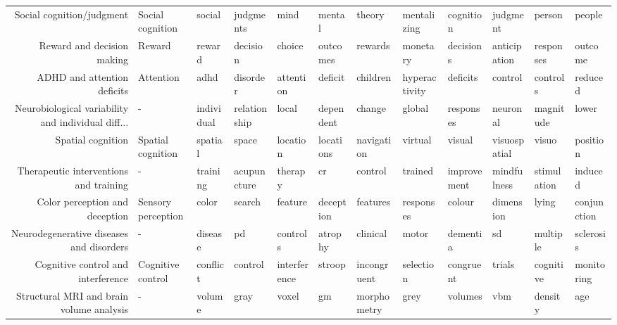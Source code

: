 \documentclass[english]{article}
\begin{document}
\begin{landscape}
\begin{center}
\begin{supertabular}{rlllllllllll}
           Social cognition/judgment &    Social cognition &           social &     judgments &            mind &         mental &      theory &    mentalizing &     cognition &       judgment &        person &         people \\
          Reward and decision making &              Reward &           reward &      decision &          choice &       outcomes &     rewards &       monetary &     decisions &   anticipation &     responses &        outcome \\
         ADHD and attention deficits &           Attention &             adhd &      disorder &       attention &        deficit &    children &  hyperactivity &      deficits &        control &      controls &        reduced \\
Neurobiological variability and individual diff... &                   - &       individual &  relationship &           local &      dependent &      change &         global &     responses &       neuronal &     magnitude &          lower \\
                   Spatial cognition &   Spatial cognition &          spatial &         space &        location &      locations &  navigation &        virtual &        visual &   visuospatial &         visuo &       position \\
Therapeutic interventions and training &                   - &         training &   acupuncture &         therapy &             cr &     control &        trained &   improvement &    mindfulness &   stimulation &        induced \\
      Color perception and deception &  Sensory perception &            color &        search &         feature &      deception &    features &      responses &        colour &      dimension &         lying &    conjunction \\
Neurodegenerative diseases and disorders &                   - &          disease &            pd &        controls &        atrophy &    clinical &          motor &      dementia &             sd &      multiple &      sclerosis \\
  Cognitive control and interference &   Cognitive control &         conflict &       control &    interference &         stroop & incongruent &      selection &     congruent &         trials &     cognitive &     monitoring \\
Structural MRI and brain volume analysis &                   - &           volume &          gray &           voxel &             gm & morphometry &           grey &       volumes &            vbm &       density &            age \\

\end{supertabular}
\end{center}
\end{landscape}
\end{document}
